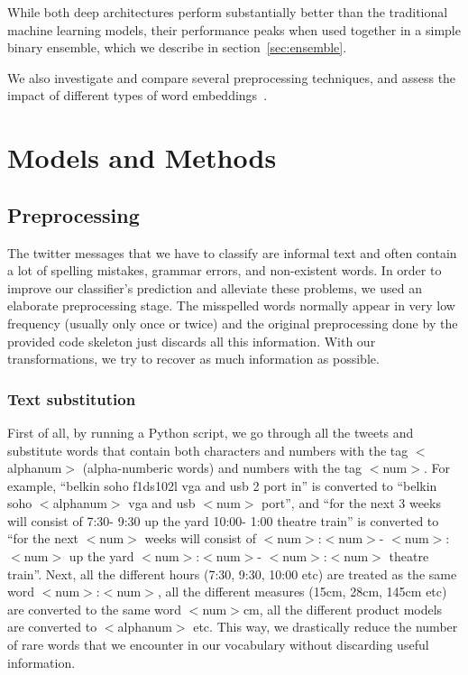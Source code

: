 \documentclass[10pt,conference,compsocconf]{IEEEtran}
\begin{document}
While both deep architectures perform substantially better than the traditional
machine learning models, their performance peaks
when used together in a simple binary ensemble, which we describe in
section~\ref{sec:ensemble}.

We also investigate and compare several preprocessing techniques, and assess
the impact of different types of word embeddings~\cite{mikolov2013efficient}.


\section{Models and Methods}
\label{sec:models}

\subsection{Preprocessing}
\label{sec:preprocessing}

The twitter messages that we have to classify are informal text and often contain a lot of spelling mistakes, grammar errors, and non-existent words. In order to improve our classifier's prediction and alleviate these problems, we used an elaborate preprocessing stage.
The misspelled words normally appear in very low frequency (usually only once or twice) and the original preprocessing done by the provided code skeleton just discards all this information.
With our transformations, we try to recover as much information as possible.

\subsubsection{Text substitution}
First of all, by running a Python script, we go through all the tweets and substitute words that contain both characters and numbers with the tag $<$alphanum$>$ (alpha-numberic words) and numbers with the tag $<$num$>$.
For example, ``belkin soho f1ds102l vga and usb 2 port in'' is converted to 
``belkin soho $<$alphanum$>$ vga and usb $<$num$>$ port'', and
``for the next 3 weeks will consist of 7:30- 9:30 up the yard 10:00- 1:00 theatre train''
is converted to 
``for the next $<$num$>$ weeks will consist of $<$num$>$:$<$num$>$- $<$num$>$:$<$num$>$ up the yard $<$num$>$:$<$num$>$- $<$num$>$:$<$num$>$ theatre train''.
Next, all the different hours (7:30, 9:30, 10:00 etc) are treated as the same word $<$num$>$:$<$num$>$, all the different measures (15cm, 28cm, 145cm etc) are converted to the same word $<$num$>$cm, all the different product models are converted to $<$alphanum$>$ etc. This way, we drastically reduce the number of rare words that we encounter in our vocabulary without discarding useful information. 
\end{document}
